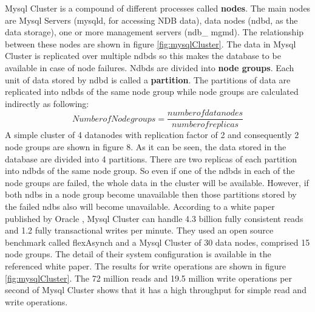 Mysql  Cluster  is   a  compound  of  different  processes   called  \textbf{nodes}.  The  main  nodes   are
Mysql  Servers   (mysqld,  for  accessing  NDB  data),  data  nodes   (ndbd,  as   the  data  storage),
one  or  more  management  servers   (ndb\_ mgmd).  The  relationship  between  these  nodes   are
shown in figure \ref{fig:mysqlCluster}.
The  data  in Mysql Cluster is  replicated over multiple ndbds  so this  makes  the database to be
available  in  case  of  node  failures.  Ndbds   are  divided  into \textbf{node groups}.  Each  unit  of  data
stored  by   ndbd  is   called  a  \textbf{partition}.  The  partitions   of  data  are  replicated  into  ndbds   of  the
same node group while node groups are calculated indirectly as following:
$$Number of Node groups  = \frac{number of  datanodes}{number of  replicas} $$
A  simple  cluster  of  4  datanodes   with  replication  factor  of  2  and  consequently  2 node groups
are shown in figure 8.
As   it  can  be  seen,  the  data stored in the database are divided into 4 partitions. There are two
replicas   of  each  partition  into  ndbds   of  the  same  node  group.  So  even  if  one  of the ndbds  in
each  of  the  node  groups   are  failed, the whole data in the cluster will be available. However, if
both  ndbs   in a node group become unavailable then those partitions  stored by  the failed ndbs
also will become unavailable.
According  to  a  white  paper  published  by   Oracle  ,  Mysql  Cluster  can  handle  4.3
billion  fully   consistent  reads   and  1.2  fully  transactional writes  per minute. They  used an open
source  benchmark   called  flexAsynch  and  a  Mysql  Cluster  of  30  data  nodes,  comprised  15
node  groups.  The  detail  of  their  system   configuration  is   available  in  the  referenced  white
paper. The results for write operations are shown in figure \ref{fig:mysqlCluster}.
The  72  million  reads   and  19.5  million  write  operations   per  second  of  Mysql  Cluster  shows
that it has a high throughput for simple read and write operations.

